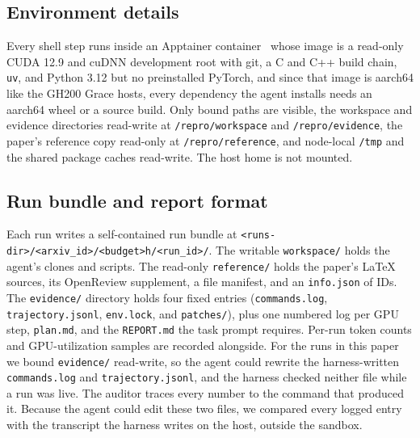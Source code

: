 
\subsection{Environment details}
\label{app:sandbox}

Every shell step runs inside an Apptainer
container~\citep{kurtzer2017singularity} whose image is a read-only CUDA 12.9
and cuDNN development root with git, a C and C++ build chain, \texttt{uv}, and
Python 3.12 but no preinstalled PyTorch, and since that image is aarch64 like the
GH200 Grace hosts, every dependency the agent installs needs an aarch64 wheel or
a source build. Only bound paths are visible, the
workspace and evidence directories read-write at \texttt{/repro/workspace} and
\texttt{/repro/evidence}, the paper's reference copy read-only at
\texttt{/repro/reference}, and node-local \texttt{/tmp} and the shared package
caches read-write. The host home is not mounted.

\subsection{Run bundle and report format}
\label{app:report-format}

Each run writes a self-contained run bundle at
\texttt{<runs-dir>/\allowbreak<arxiv\_id>/\allowbreak<budget>h/\allowbreak<run\_id>/}.
The writable \texttt{workspace/} holds the agent's clones and scripts. The
read-only \texttt{reference/} holds the paper's LaTeX sources, its OpenReview
supplement, a file manifest, and an \texttt{info.json} of IDs. The
\texttt{evidence/} directory holds four fixed entries (\texttt{commands.log},
\texttt{trajectory.jsonl}, \texttt{env.lock}, and \texttt{patches/}), plus
one numbered log per GPU step, \texttt{plan.md}, and the \texttt{REPORT.md}
the task prompt requires. Per-run token counts and GPU-utilization samples are
recorded alongside. For the runs in this paper we bound \texttt{evidence/}
read-write, so the agent could rewrite the harness-written
\texttt{commands.log} and \texttt{trajectory.jsonl}, and the harness checked
neither file while a run was live. The auditor traces every number to the
command that produced it. Because the agent could edit these two files, we
compared every logged entry with the transcript the harness writes on the
host, outside the sandbox.

